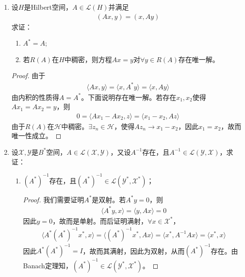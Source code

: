 \begin{enumerate}[leftmargin=2cm, label=\arabic*]
    \item 设$H$是Hilbert空间，$A\in\mathscr{L}(H)$并满足
    \begin{align*}
        (Ax,y) = (x, Ay)
    \end{align*}
    求证：
    \begin{enumerate}[leftmargin=1cm, label=(\arabic*)]
        \item $A^* = A$;
        \item 若$R(A)$在$H$中稠密，则方程$Ax = y$对$\forall y\in R(A)$存在唯一解。
    \end{enumerate}
    \begin{proof}
        由于
        \begin{align*}
            \langle Ax, y\rangle = \langle x, A^* y\rangle = \langle x, Ay\rangle
        \end{align*}
        由内积的性质得$A = A^*$。下面说明存在唯一解。若存在$x_1,x_2$使得$Ax_1 = Ax_2 = y$，则
        \begin{align*}
            0 = \langle Ax_1 - Ax_2, z\rangle = \langle x_1 - x_2, Az\rangle
        \end{align*}
        由于$R(A)$在$\mathscr{H}$中稠密。$\exists z_n\in\mathscr{H}$，使得$Az_n\to x_1-x_2$，因此$x_1 = x_2$，故而唯一性成立。
    \end{proof}

    \item 设$\mathscr{X},\mathscr{Y}$是$B^*$空间，$A\in\mathscr{L}(\mathscr{X},\mathscr{Y})$，又设$A^{-1}$存在，且$A^{-1}\in\mathscr{L}(\mathscr{Y},\mathscr{X})$，求证：
    \begin{enumerate}[leftmargin=1cm, label=(\arabic*)]
        \item $(A^*)^{-1}$存在，且$(A^*)^{-1}\in\mathscr{L}(\mathscr{Y}^*,\mathscr{X}^*)$；
        \begin{proof}
            我们需要证明$A^*$是双射。若$A^*y = 0$，则
            \begin{align*}
                \langle A^*y, x\rangle = \langle y, Ax\rangle = 0
            \end{align*}
            因此$y = 0$，故而是单射。而后证明满射，$\forall x\in\mathscr{X}^*$，
            \begin{align*}
                \langle A^*(A^*)^{-1}x^*, x \rangle = \langle (A^*)^{-1}x^*, Ax\rangle = \langle x^*, A^{-1}Ax\rangle = \langle x^*, x\rangle
            \end{align*}
            因此$A^*(A^*)^{-1} = I$，故而其满射，因此为双射，从而$(A^*)^{-1}$存在。由Banach定理知，$(A^*)^{-1}\in\mathscr{L}(\mathscr{Y}^*,\mathscr{X}^*)$。
        \end{proof}
        

\end{enumerate}
\end{enumerate}
